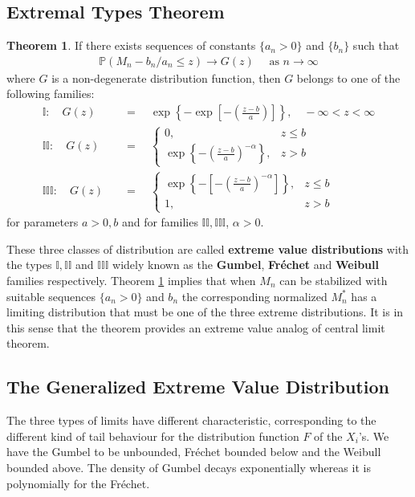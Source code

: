 \documentclass[a4paper,10pt]{article}
\theoremstyle{definition}
\newtheorem{thm}{Theorem}[section]
\numberwithin{equation}{section}
\begin{document}
\subsection{Extremal Types Theorem}

\begin{thm}\label{thm:gfw}
If there exists sequences of constants $\{a_n>0\}$ and $\{b_n\}$ such that 
\begin{align*}
\mathbb{P}(M_n-b_n/a_n \leq z) \to G(z) \quad \text{ as } n \to \infty
\end{align*}
where $G$ is a non-degenerate distribution function, then $G$ belongs to one of the following families:
\begin{align*}
\mathbb{I}:\quad G(z)\quad&= \quad\exp \left\{-\exp\left[-\left(\frac{z-b}{a}\right)\right]\right\}, \quad -\infty<z<\infty\\
\mathbb{II}: \quad G(z)\quad&= \quad\begin{cases}
0, & z \leq b\\
\exp\left\{-\left(\frac{z-b}{a}\right)^{-\alpha}\right\}, &z >b
\end{cases}
\\
\mathbb{III}:\quad G(z)\quad&=  \quad\begin{cases}
\exp\left\{-\left[-\left(\frac{z-b}{a}\right)^{-\alpha}\right]\right\}, & z \leq b\\
1, &z >b
\end{cases}
\end{align*}
for parameters $a>0, b$ and for families $\mathbb{II}, \mathbb{III}$, $\alpha >0$.
\end{thm}
These three classes of distribution are called \textbf{extreme value distributions} with the types $\mathbb{I},\mathbb{II}$ and $\mathbb{III}$ widely known as the \textbf{Gumbel}, \textbf{Fr\'echet} and \textbf{Weibull} families respectively. Theorem \ref{thm:gfw} implies that when $M_n$ can be stabilized with suitable sequences $\{a_n>0\}$ and $b_n$ the corresponding normalized $M_n^\ast$ has a limiting distribution that must be one of the three extreme distributions. It is in this sense that the theorem provides an extreme value analog of central limit theorem.

\subsection{The Generalized Extreme Value Distribution}
The three types of limits have different characteristic, corresponding to the different kind of tail behaviour for the distribution function $F$ of the $X_i$'s. We have the Gumbel to be unbounded, Fr\'echet bounded below and the Weibull bounded above. The density of Gumbel decays exponentially whereas it is polynomially for the Fr\'echet.
\end{document}
